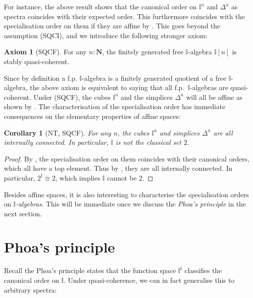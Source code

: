 \documentclass[a4paper,12pt]{amsart}
\newtheorem{corollary}[theorem]{Corollary}
\theoremstyle{definition}
\newtheorem*{axiom}{Axiom}
\newcommand{\mb}[1]{\mathbf{#1}}
\newcommand{\mbb}[1]{\mathbb{#1}}
\newcommand{\I}{\mbb I}
\newcommand{\N}{\mb N}
\begin{document}
For instance, the above result shows that the canonical order on $\I^n$ and $\Delta^n$ as spectra coincides with their expected order. This furthermore coincides with the specialisation order on them if they are affine by . This goes beyond the assumption (SQCI), and we introduce the following stronger axiom:

\begin{axiom}[SQCF]
  For any $n : \N$, the finitely generated free $\I$-algebra $\I[n]$ is stably quasi-coherent. 
\end{axiom}

Since by definition a f.p. $\I$-algebra is a finitely generated quotient of a free $\I$-algebra, the above axiom is equivalent to saying that all f.p.\ $\I$-algebras are quasi-coherent. 
Under (SQCF), the cubes $\I^n$ and the simplices $\Delta^n$ will all be affine as shown by . The characterisation of the specialisation order has immediate consequences on the elementary properties of affine spaces:

\begin{corollary}[NT, SQCF]\label{cor:intisnot2}
  For any $n$, the cubes $\I^n$ and simplices $\Delta^n$ are all internally connected. In particular, $\I$ is not the classical set $2$.
\end{corollary}
\begin{proof}
  By , the specialisation order on them coincides with their canonical orders, which all have a top element. Thus by , they are all internally connected. In particular, $2^\I \cong 2$, which implies $\I$ cannot be $2$.
\end{proof}

Besides affine spaces, it is also interesting to characterise the specialisation orders on \emph{$\I$-algebras}. This will be immediate once we discuss the \emph{Phoa's principle} in the next section.

\section{Phoa's principle}

Recall the Phoa's principle states that the function space $\I^\I$ classifies the canonical order on $\I$. Under quasi-coherence, we can in fact generalise this to arbitrary spectra:
\end{document}
